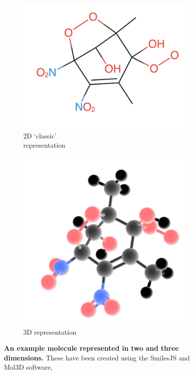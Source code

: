 \begin{figure}[H]
    \centering
    \begin{subfigure}[b]{0.24\textwidth}
        \centering
        \includegraphics[width=\textwidth]{figures_c1/mol2d.png}
        \caption{2D `classic'\\ representation}
    \end{subfigure}
    \begin{subfigure}[b]{0.235\textwidth}
        \centering
        \includegraphics[width=\textwidth]{figures_c1/mol3d.png}
        \caption{3D representation}
    \end{subfigure}
       \caption{\textbf{An example molecule represented in two and three dimensions.} These have been created  using the SmilesJS and Mol3D software, \cite{smiles, mol3d} }
       \label{fig:mol}
\end{figure}

